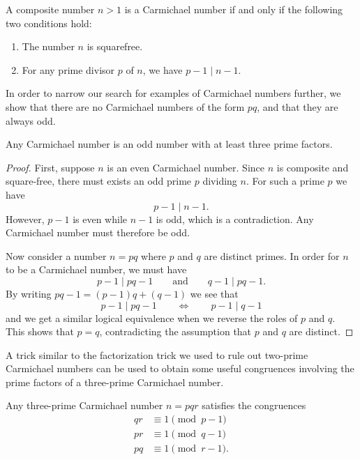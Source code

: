 \begin{theorem}
  A composite number $n>1$ is a Carmichael number if and only if the following two conditions hold:
  \begin{enumerate}
  \item The number $n$ is squarefree.
  \item For any prime divisor $p$ of $n$, we have $p-1\mid n-1$.
  \end{enumerate}
\end{theorem}

In order to narrow our search for examples of Carmichael numbers further, we show that there are no Carmichael numbers of the form $pq$, and that they are always odd.

\begin{theorem}
  Any Carmichael number is an odd number with at least three prime factors.
\end{theorem}

\begin{proof}
  First, suppose $n$ is an even Carmichael number. Since $n$ is composite and square-free, there must exists an odd prime $p$ dividing $n$. For such a prime $p$ we have
  \begin{equation*}
    p-1\mid n-1.
  \end{equation*}
  However, $p-1$ is even while $n-1$ is odd, which is a contradiction. Any Carmichael number must therefore be odd.
  
  Now consider a number $n=pq$ where $p$ and $q$ are distinct primes. In order for $n$ to be a Carmichael number, we must have
  \begin{equation*}
    p-1\mid pq-1\qquad\text{and}\qquad q-1\mid pq-1.
  \end{equation*}
  By writing $pq-1=(p-1)q + (q-1)$ we see that
  \begin{equation*}
    p-1\mid pq-1\qquad\Leftrightarrow\qquad p-1\mid q-1
  \end{equation*}
  and we get a similar logical equivalence when we reverse the roles of $p$ and $q$. This shows that $p=q$, contradicting the assumption that $p$ and $q$ are distinct.
\end{proof}

A trick similar to the factorization trick we used to rule out two-prime Carmichael numbers can be used to obtain some useful congruences involving the prime factors of a three-prime Carmichael number.

\begin{proposition}
  Any three-prime Carmichael number $n=pqr$ satisfies the congruences
  \begin{align*}
    qr & \equiv 1\pmod{p-1} \\
    pr & \equiv 1\pmod{q-1} \\
    pq & \equiv 1\pmod{r-1}.
  \end{align*}
\end{proposition}

